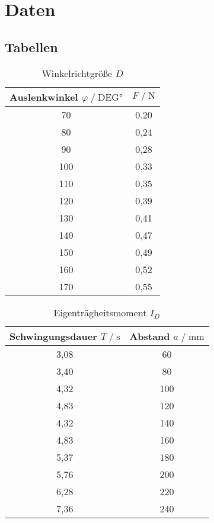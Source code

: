 \section{Daten}
\label{sec:Daten}

\subsection{Tabellen}


\begin{table}
    \centering
    \caption{Winkelrichtgröße $D$}
    \label{tab:winkelrichtgroesse}
    \begin{tabular}{c c}
        \toprule
        Auslenkwinkel $ \varphi \;/\; \text{DEG}\si{\degree}$ & $F \;/\; \si{\newton}$ \\
        \midrule
        70 & 0.20 \\
        80 & 0,24 \\
        90 & 0,28 \\
        100 & 0,33 \\
        110 & 0,35 \\
        120 & 0,39 \\
        130 & 0,41 \\
        140 & 0,47 \\
        150 & 0,49 \\
        160 & 0,52 \\
        170 & 0,55 \\
        \bottomrule
    \end{tabular}
\end{table}


\begin{table}
   \centering
    \caption{Eigenträgheitsmoment $I_D$}
    \label{tab:eigentraegheitsmoment}
    \begin{tabular}{c c}
        \toprule
        Schwingungsdauer $ T \;/\; \si{\second}$ & Abstand $a \;/\; \si{\milli\meter}$ \\
        \midrule
        3,08 & 60 \\
        3,40 & 80 \\
        4,32 & 100 \\
        4,83 & 120 \\
        4,32 & 140 \\
        4,83 & 160 \\
        5,37 & 180 \\
        5,76 & 200 \\
        6,28 & 220 \\
        7,36 & 240 \\
        \bottomrule
    \end{tabular}
\end{table}

